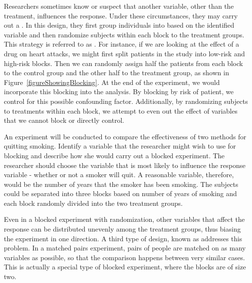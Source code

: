 Researchers sometimes know or suspect that another variable, other than the treatment, influences the response. Under these circumstances, they may carry out a . In this design, they first group individuals into  based on the identified variable and then randomize subjects within each block to the treatment groups. This strategy is referred to as . For instance, if we are looking at the effect of a drug on heart attacks, we might first split patients in the study into low-risk and high-risk blocks. Then we can randomly assign half the patients from each block to the control group and the other half to the treatment group, as shown in Figure~\ref{figureShowingBlocking}. At the end of the experiment, we would incorporate this blocking into the analysis. By blocking by risk of patient, we control for this possible confounding factor. Additionally, by randomizing subjects to treatments within each block, we attempt to even out the effect of variables that we cannot block or directly control.

\begin{example}{An experiment will be conducted to compare the effectiveness of two methods for quitting smoking. Identify a variable that the researcher might wish to use for blocking and describe how she would carry out a blocked experiment.}
The researcher should choose the variable that is most likely to influence the response variable - whether or not a smoker will quit. A reasonable variable, therefore, would be the number of years that the smoker has been smoking. The subjects could be separated into three blocks based on number of years of smoking and each block randomly divided into the two treatment groups.
\end{example}

Even in a blocked experiment with randomization, other variables that affect the response can be distributed unevenly among the treatment groups, thus biasing the experiment in one direction. A third type of design, known as  addresses this problem. In a matched pairs experiment, pairs of people are matched on as many variables as possible, so that the comparison happens between very similar cases. This is actually a special type of blocked experiment, where the blocks are of size two.


